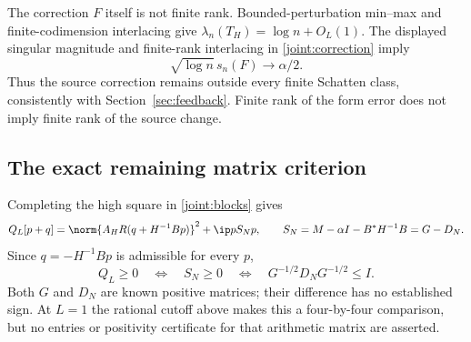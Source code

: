 The correction $F$ itself is not finite rank. Bounded-perturbation
min--max and finite-codimension interlacing give
$\lambda_n(T_H)=\log n+O_L(1)$.
The displayed singular magnitude and finite-rank interlacing in
\eqref{joint:correction} imply
\begin{equation}\label{joint:singular}
\sqrt{\log n}\,s_n(F)\longrightarrow\alpha/2.
\end{equation}
Thus the source correction remains outside every finite Schatten
class, consistently with Section~\ref{sec:feedback}. Finite rank
of the form error does not imply finite rank of the source change.

\subsection{The exact remaining matrix criterion}
Completing the high square in \eqref{joint:blocks} gives
\begin{equation}\label{joint:schur}
Q_L[p+q]=\norm{A_HR(q+H^{-1}Bp)}^2+\ip p{S_Np},
\qquad
S_N=M-\alpha I-B^*H^{-1}B=G-D_N.
\end{equation}
Since $q=-H^{-1}Bp$ is admissible for every $p$,
\begin{equation}\label{joint:criterion}
Q_L\ge0\quad\Longleftrightarrow\quad S_N\ge0
\quad\Longleftrightarrow\quad G^{-1/2}D_NG^{-1/2}\le I.
\end{equation}
Both $G$ and $D_N$ are known positive matrices; their difference
has no established sign. At $L=1$ the rational cutoff above makes
this a four-by-four comparison, but no entries or positivity
certificate for that arithmetic matrix are asserted.


